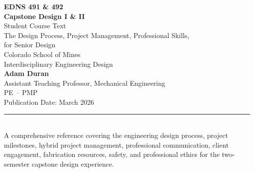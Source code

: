 




\hypersetup{pageanchor=false}
\begin{titlepage}
\begin{center}
\vspace*{2cm}
{\Huge\bfseries\sffamily\textcolor{MinesBlue}{EDNS 491 \& 492}}\\[0.5cm]
{\Huge\bfseries\sffamily\textcolor{MinesBlue}{Capstone Design I \& II}}\\[2cm]
{\huge\sffamily\textcolor{MinesBlue}{Student Course Text}}\\[1cm]
{\Large\sffamily The Design Process, Project Management, Professional Skills,}\\[0.2cm]
{\Large\sffamily for Senior Design}\\[3cm]
{\large\sffamily\textcolor{MinesSilver}{Colorado School of Mines}}\\[0.3cm]
{\large\sffamily\textcolor{MinesSilver}{Interdisciplinary Engineering Design}}\\[1.5cm]
{\Large\sffamily\textbf{Adam Duran}}\\[0.2cm]
{\normalsize\sffamily Assistant Teaching Professor, Mechanical Engineering}\\[0.2cm]
{\normalsize\sffamily\textcolor{MinesSilver}{PE \,$\cdot$\, PMP}}\\[1.5cm]
{\normalsize\sffamily\textcolor{MinesSilver}{Publication Date: March 2026}}\\[0.8cm]
\textcolor{MinesBlue}{\rule{0.6\textwidth}{1pt}}\\[0.5cm]
{\normalsize\sffamily A comprehensive reference covering the engineering design process, project milestones, hybrid project management, professional communication, client engagement, fabrication resources, safety, and professional ethics for the two-semester capstone design experience.}
\end{center}
\end{titlepage}

